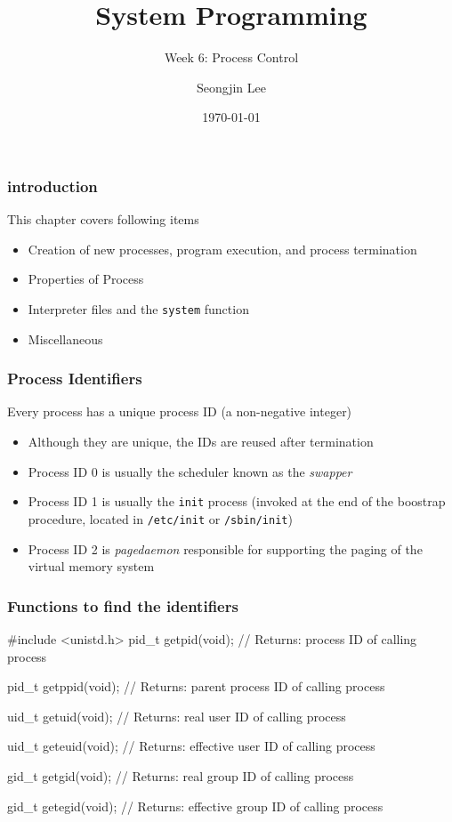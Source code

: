 \documentclass[newPxFont,sthlmFooter,nooffset]{beamer}
\title{System Programming}
\subtitle{Week 6: Process Control}
\author[SJL]{Seongjin Lee}
\institute{\href{mailto:insight@gnu.ac.kr}{insight@gnu.ac.kr}\\\url{http://open.gnu.ac.kr}\\Systems Research Lab.\\Gyeongsang National University}
\date{\today}
\begin{document}
\frame[plain]{\titlepage}






\begin{frame}[t]
  \frametitle{introduction}
This chapter covers following items
  \begin{itemize}
  \item Creation of new processes, program execution, and process termination
  \item Properties of Process
  \item Interpreter files and the \texttt{system} function
  \item Miscellaneous
  \end{itemize}

\end{frame}


\begin{frame}[t]
  \frametitle{Process Identifiers}
Every process has a unique process ID (a non-negative integer)
\begin{itemize}
\item Although they are unique, the IDs are reused after termination
\item Process ID 0 is usually the scheduler known as the \textit{swapper}
\item Process ID 1 is usually the \texttt{init} process (invoked at the end of the boostrap procedure, located in \texttt{/etc/init} or \texttt{/sbin/init})
\item Process ID 2 is \textit{pagedaemon} responsible for supporting the paging of the virtual memory system
\end{itemize}
\end{frame}

\begin{frame}[containsverbatim,t]
  \frametitle{Functions to find the identifiers}
\begin{codedef}
#include <unistd.h>
pid_t getpid(void);
// Returns: process ID of calling process

pid_t getppid(void);
// Returns: parent process ID of calling process

uid_t getuid(void);
// Returns: real user ID of calling process

uid_t geteuid(void);
// Returns: effective user ID of calling process

gid_t getgid(void);
// Returns: real group ID of calling process

gid_t getegid(void);
// Returns: effective group ID of calling process
\end{codedef}
\end{frame}
\end{document}
